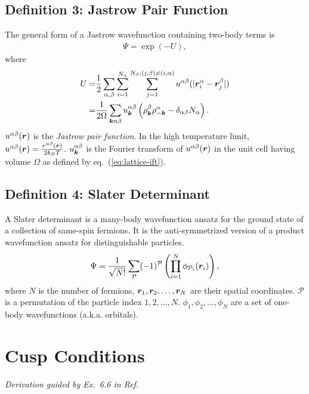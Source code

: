 \subsection{Definition 3: Jastrow Pair Function}
The general form of a Jastrow wavefunction containing two-body terms is
\begin{align} \label{eq:wf-def-jas}
\Psi = \exp\left(-U\right),
\end{align}
where
\begin{align} \label{eq:wf-def-j2}
U =& \frac{1}{2}\sum\limits_{\alpha, \beta} \sum\limits_{i=1}^{N_\alpha} \sum\limits_{j=1}^{N_\beta, (j,\beta)\neq(i,\alpha)} 
u^{\alpha\beta}(\vert\boldsymbol{r}_i^\alpha - \boldsymbol{r}_j^\beta \vert) \nonumber \\
=& \frac{1}{2\Omega} \sum\limits_{\boldsymbol{k}\alpha\beta}
u^{\alpha\beta}_{\boldsymbol{k}} \left( \rho^\beta_{\boldsymbol{k}}\rho^\alpha_{-\boldsymbol{k}}-\delta_{\alpha\beta}N_\alpha \right).
\end{align}
$u^{\alpha\beta}(\boldsymbol{r})$ is the \emph{Jastrow pair function}. In the high temperature limit, $u^{\alpha\beta}(\boldsymbol{r})=\frac{v^{\alpha\beta}(\boldsymbol{r})}{2k_BT}$. $u^{\alpha\beta}_{\boldsymbol{k}}$ is the Fourier transform of $u^{\alpha\beta}(\boldsymbol{r})$ in the unit cell having volume $\Omega$ as defined by eq.~(\ref{eq:lattice-ift}).

\subsection{Definition 4: Slater Determinant}
A Slater determinant is a many-body wavefunction ansatz for the ground state of a collection of same-spin fermions. It is the anti-symmetrized version of a product wavefunction ansatz for distinguishable particles.
\begin{align}
\Psi = \frac{1}{\sqrt{N!}}\sum\limits_{\mathcal{P}} (-1)^{\mathcal{P}} \left( \prod\limits_{i=1}^N \phi_{\mathcal{P}_i}(\boldsymbol{r}_i) \right),\label{eq:det}
\end{align}
where $N$ is the number of fermions, $\boldsymbol{r}_1, \boldsymbol{r}_2, \dots, \boldsymbol{r}_N$ are their spatial coordinates. $\mathcal{P}$ is a permutation of the particle index $1, 2, \dots, N$. $\phi_1, \phi_2, \dots, \phi_N$ are a set of one-body wavefunctions (a.k.a. orbitals).

\section{Cusp Conditions}\label{sec:wf-cusp}
\emph{Derivation guided by Ex.~6.6 in Ref.~\cite{Martin2016}}

